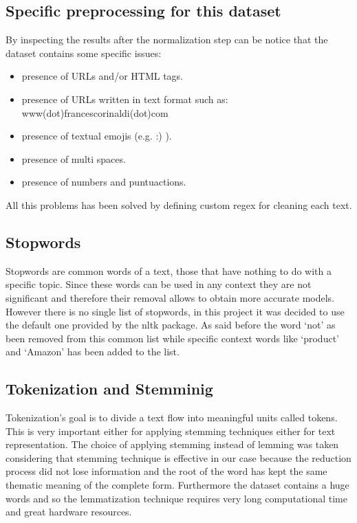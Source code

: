 \documentclass[11pt]{article}
\begin{document}
\subsection{Specific preprocessing for this dataset}
By inspecting the results after the normalization step can be notice that the dataset contains some specific issues:
\begin{itemize}
    \item presence of URLs and/or HTML tags.
    \item presence of URLs written in text format such as: www(dot)francescorinaldi(dot)com
    \item presence of textual emojis (e.g. :) ).
    \item presence of multi spaces.
    \item presence of numbers and puntuactions.
\end{itemize}
All this problems has been solved by defining custom regex for cleaning each text. 

\subsection{Stopwords}
Stopwords are common words of a text, those that have nothing to do with a specific topic. Since these words can be used in any context they are not significant and therefore their removal allows to obtain more accurate models. However there is no single list of stopwords, in this project it was decided to use the default one provided by the nltk package. As said before the word `not' as been removed from this common list while specific context words like `product' and `Amazon' has been added to the list.

\subsection{Tokenization and Stemminig}
Tokenization's goal is to divide a text flow into meaningful units called tokens. This is very important either for applying stemming techniques either for text representation.
The choice of applying stemming instead of lemming was taken considering that stemming technique is effective in our case because the reduction process did not lose information and the root of the word has kept the same thematic meaning of the complete form. Furthermore the dataset contains a huge words and so the lemmatization technique requires very long computational time and great hardware resources.
\end{document}
